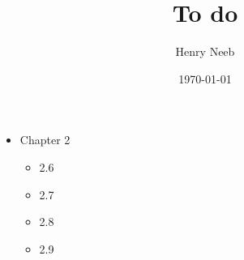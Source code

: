 \documentclass{article}
\title{To do}
\author{Henry Neeb}
\date{\today}
\begin{document}
\maketitle

\begin{itemize}
\item Chapter 2
\begin{itemize}
\item 2.6
\item 2.7
\item 2.8
\item 2.9
\end{itemize}
\end{itemize}
\end{document}
